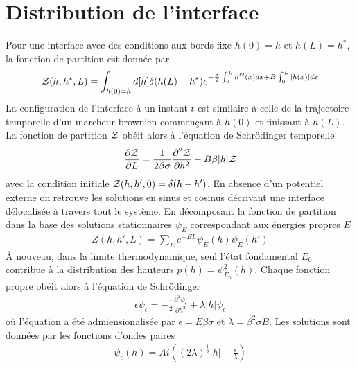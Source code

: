     \section{Distribution de l'interface}

Pour une interface avec des conditions aux bords fixe $h(0) = h$ et $h(L) = h^\ast$, la fonction de partition est donnée par
\begin{align}
	\mathcal{Z}(h,h^\ast,L) = \int_{h(0)=h} d[h] \delta(h(L)-h^\ast)e^{-\frac{\sigma}{2} \int_0^L h'^2(x) dx + B \int_0^L |h(x)|dx}
\end{align}
La configuration de l'interface à un instant $t$ est similaire à celle de la trajectoire temporelle d'un marcheur brownien commençant à $h(0)$ et finissant à $h(L)$\cite{}.
La fonction de partition $\mathcal{Z}$ obéit alors à l'équation de Schrödinger temporelle
\begin{align}
	\frac{\partial \mathcal{Z}}{\partial L} = \frac{1}{2 \beta \sigma} \frac{\partial^2 \mathcal{Z}}{\partial h^2}  - B \beta |h| \mathcal{Z}
\end{align}
avec la condition initiale $\mathcal{Z}(h,h',0) = \delta(h-h')$.  En absence d'un potentiel externe on retrouve les solutions en sinus et cosinus décrivant une interface délocalisée à travers tout le système. En décomposant la fonction de partition dans la base des solutions stationnaires $\psi_E$ correspondant aux énergies propres $E$ 
\begin{align}
	Z(h,h',L) = \sum_E e^{-EL}\psi_E(h)\psi_E(h')
	\label{schro_temp}
\end{align}
À nouveau, dans la limite thermodynamique, seul l'état fondamental $E_0$ contribue à la distribution des hauteurs $p(h) = \psi_{E_0}^2(h)$.
Chaque fonction propre obéit alors à l'équation de Schrödinger 
\begin{align}
	\epsilon \psi_\epsilon = - \frac{1}{2} \frac{\partial^2 \psi_\epsilon}{\partial h^2} + \lambda |h| \psi_\epsilon
\end{align}
où l'équation a été admiensionalisée par $\epsilon = E\beta\sigma$ et $\lambda=\beta^2 \sigma B$.
Les solutions sont données par les fonctions d'ondes paires
\begin{align}
	\psi_\epsilon (h) = Ai \left( (2\lambda)^\frac{1}{3}|h|-\frac{\epsilon}{\lambda} \right)
\end{align}


